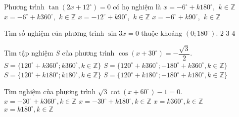 \begin{ex}%
	Phương trình $\tan \left( 2x+12^\circ \right)=0$ có họ nghiệm là
	\choice
	{$x=-6^\circ+k180^\circ$, $\ k\in \mathbb{Z}$}
	{$x=-6^\circ+k360^\circ$, $\ k\in \mathbb{Z}$}
	{$x=-12^\circ+k90^\circ$, $\ k\in \mathbb{Z}$}
	{\True $x=-6^\circ+k90^\circ$, $\ k\in \mathbb{Z}$}
\end{ex}

\begin{ex}%
	Tìm số nghiệm của phương trình $ \sin 3x=0$ thuộc khoảng $\left(0; 180^\circ\right)$.
	{\True $2 $}
	{$3 $}
	{$4 $}
\end{ex}
\begin{ex}%
	Tìm tập nghiệm $S$ của phương trình $\cos (x+30^\circ) = -\dfrac{\sqrt{3}}{2}$.
	\choice
	{$S=\{120^\circ + k360^\circ; k360^\circ, k\in \mathbb{Z}\}$}
	{\True $S=\{120^\circ + k360^\circ; -180^\circ+k360^\circ, k\in \mathbb{Z}\}$}
	{$S=\{120^\circ + k180^\circ; k180^\circ, k\in \mathbb{Z}\}$}
	{$S=\{120^\circ + k180^\circ; -180^\circ+k180^\circ, k\in \mathbb{Z}\}$}
\end{ex}
\begin{ex}%
	Tìm nghiệm của phương trình $\sqrt{3}\cot \left(x+60^\circ\right)-1=0$.
	\choice
	{$x=-30^\circ+k360^\circ,k\in\mathbb{Z}$}
	{$x=-30^\circ+k180^\circ,k\in\mathbb{Z}$}
	{$x=k360^\circ,k\in\mathbb{Z}$}
	{\True $x=k180^\circ,k\in\mathbb{Z}$}
\end{ex}
